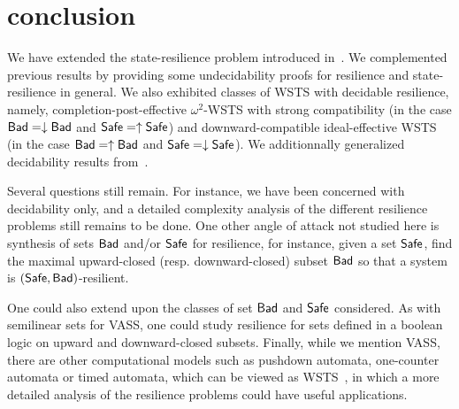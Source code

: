 



\section{conclusion}


We have extended the state-resilience problem introduced in~\cite{DBLP:journals/corr/abs-2108-00889,DBLP:conf/gg/Ozkan22}.
We complemented previous results by providing some undecidability proofs for resilience and state-resilience in general. We also exhibited classes of WSTS with decidable resilience, namely, 
completion-post-effective $\omega^2$-WSTS with strong compatibility (in the case $\textsf{Bad} = \downarrow \textsf{Bad}$ and $\textsf{Safe} = \uparrow \textsf{Safe}$) and 
downward-compatible
ideal-effective WSTS
(in the case $\textsf{Bad} = \uparrow \textsf{Bad}$ and $\textsf{Safe} = \downarrow \textsf{Safe}$).
We additionnally generalized decidability results from~\cite{DBLP:journals/corr/abs-2108-00889,DBLP:conf/gg/Ozkan22}.

Several questions still remain.
For instance, we have been concerned with decidability only, and a detailed complexity analysis of the different resilience problems still remains to be done. 
One other angle of attack not studied here is synthesis of sets $\textsf{Bad}$ and/or $\textsf{Safe}$ for resilience,
for instance, given a set $\textsf{Safe}$, find the maximal upward-closed (resp. downward-closed) subset 
$\textsf{Bad}$ so that a system is $(\textsf{Safe},\textsf{Bad})$-resilient. 

One could also extend upon the classes of set $\textsf{Bad}$ and $\textsf{Safe}$ considered. As with semilinear sets for VASS, one could study resilience for sets defined in a boolean logic on upward and downward-closed subsets. Finally, while we mention VASS, there are other computational models such as pushdown automata, one-counter automata or timed automata, which can be viewed as WSTS~\cite{DBLP:journals/tcs/FinkelS01}, in which a more detailed analysis of the resilience problems could have useful applications.


%
%
%
%


